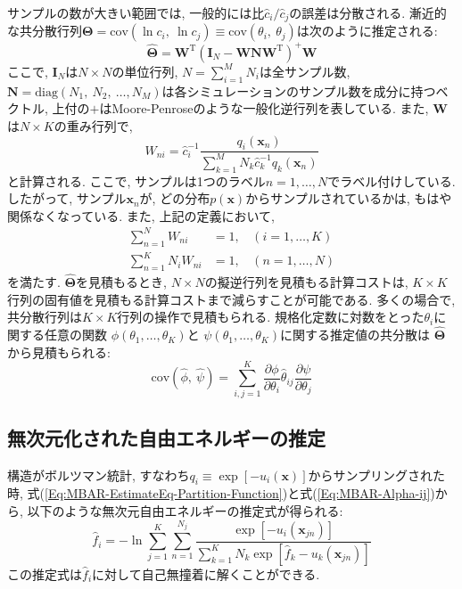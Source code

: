 サンプルの数が大きい範囲では, 一般的には比$\hat{c}_{i} / \hat{c}_{j}$の誤差は分散される. 
漸近的な共分散行列$\bm{\Theta} = \textrm{cov}(\ln c_{i},~\ln c_{j}) \equiv \textrm{cov}(\theta_{i},~\theta_{j})$は次のように推定される:
\begin{equation}
    \hat{\bm{\Theta}} =
    \bm{W}^{\mathrm{T}}
    \left(\bm{I}_{N} - \bm{W}\bm{N}\bm{W}^{\mathrm{T}}\right)^{+}
    \bm{W}
    \label{Eq:MBAR-Estimation-Variance-Covariance}
\end{equation}
ここで, $\bm{I}_{N}$は$N \times N$の単位行列, 
$N=\sum_{i=1}^{M}N_{i}$は全サンプル数, 
$\bm{N} = \mathrm{diag}(N_{1},~N_{2},~\ldots,N_{M})$は各シミュレーションのサンプル数を成分に持つベクトル, 
上付の$+$はMoore-Penroseのような一般化逆行列を表している. 
また, $\bm{W}$は$N \times K$の重み行列で, 
\begin{equation}
    W_{ni} =
    \hat{c}_{i}^{-1}
    \frac{q_{i}(\bm{x}_{n})}
    {\sum_{k=1}^{M} N_{k} \hat{c}_{k}^{-1} q_{k}(\bm{x}_{n})}
    \label{Eq:MBAR-Weight-Matrix}
\end{equation}
と計算される. ここで, サンプルは1つのラベル$n=1,\ldots,N$でラベル付けしている. 
したがって, サンプル$\bm{x}_{n}$が, どの分布$p(\bm{x})$からサンプルされているかは, もはや関係なくなっている. 
また, 上記の定義において, 
\begin{align}
    \sum_{n=1}^{N} W_{ni}       &= 1, ~~~~(i = 1,\ldots,K) \\
    \sum_{n=1}^{K} N_{i} W_{ni} &= 1, ~~~~(n = 1,\ldots,N)
\end{align}
を満たす. 
$\hat{\bm{\Theta}}$を見積もるとき, $N \times N$の擬逆行列を見積もる計算コストは, $K \times K$行列の固有値を見積もる計算コストまで減らすことが可能である. 多くの場合で, 共分散行列は$K \times K$行列の操作で見積もられる. 
規格化定数に対数をとった$\theta_{i}$に関する任意の関数
$\phi(\theta_{1},\ldots,\theta_{K})$と
$\psi(\theta_{1},\ldots,\theta_{K})$に関する推定値の共分散は
$\hat{\bm{\Theta}}$から見積もられる:
\begin{equation}
    \mathrm{cov}(\hat{\phi},~\hat{\psi}) =
    \sum_{i,j=1}^{K}
    \frac{\partial \phi}{\partial \theta_{i}}
    \hat{\theta}_{ij}
    \frac{\partial \psi}{\partial \theta_{j}}
\end{equation}

\subsection{無次元化された自由エネルギーの推定}
構造がボルツマン統計, すなわち$q_{i} \equiv \exp[-u_{i}(\bm{x})]$からサンプリングされた時, 式(\ref{Eq:MBAR-EstimateEq-Partition-Function})と式(\ref{Eq:MBAR-Alpha-ij})から, 以下のような無次元自由エネルギーの推定式が得られる:
\begin{equation}
    \hat{f}_{i} =
    -\ln \sum_{j=1}^{K} \sum_{n=1}^{N_{j}}
    \frac
    {\exp[-u_{i}(\bm{x}_{jn})]}
    {\sum_{k=1}^{K} N_{k} \exp[\hat{f}_{k} - u_{k}(\bm{x}_{jn})]}
    \label{Eq:MBAR-Dimensionless-Free-Energy}
\end{equation}
この推定式は$\hat{f}_{i}$に対して自己無撞着に解くことができる. 

